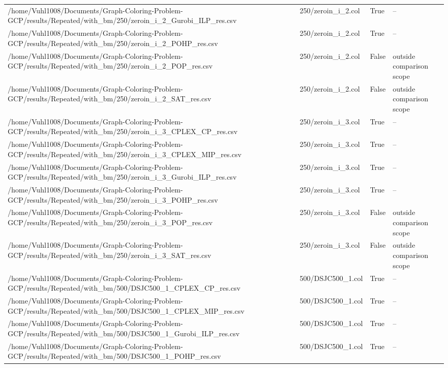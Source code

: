 \begin{table}[htbp]
\begin{tabular}{llll}
/home/Vuhl1008/Documents/Graph-Coloring-Problem-GCP/results/Repeated/with\_bm/250/zeroin\_i\_2\_Gurobi\_ILP\_res.csv & 250/zeroin\_i\_2.col & True & -- \\
/home/Vuhl1008/Documents/Graph-Coloring-Problem-GCP/results/Repeated/with\_bm/250/zeroin\_i\_2\_POHP\_res.csv & 250/zeroin\_i\_2.col & True & -- \\
/home/Vuhl1008/Documents/Graph-Coloring-Problem-GCP/results/Repeated/with\_bm/250/zeroin\_i\_2\_POP\_res.csv & 250/zeroin\_i\_2.col & False & outside comparison scope \\
/home/Vuhl1008/Documents/Graph-Coloring-Problem-GCP/results/Repeated/with\_bm/250/zeroin\_i\_2\_SAT\_res.csv & 250/zeroin\_i\_2.col & False & outside comparison scope \\
/home/Vuhl1008/Documents/Graph-Coloring-Problem-GCP/results/Repeated/with\_bm/250/zeroin\_i\_3\_CPLEX\_CP\_res.csv & 250/zeroin\_i\_3.col & True & -- \\
/home/Vuhl1008/Documents/Graph-Coloring-Problem-GCP/results/Repeated/with\_bm/250/zeroin\_i\_3\_CPLEX\_MIP\_res.csv & 250/zeroin\_i\_3.col & True & -- \\
/home/Vuhl1008/Documents/Graph-Coloring-Problem-GCP/results/Repeated/with\_bm/250/zeroin\_i\_3\_Gurobi\_ILP\_res.csv & 250/zeroin\_i\_3.col & True & -- \\
/home/Vuhl1008/Documents/Graph-Coloring-Problem-GCP/results/Repeated/with\_bm/250/zeroin\_i\_3\_POHP\_res.csv & 250/zeroin\_i\_3.col & True & -- \\
/home/Vuhl1008/Documents/Graph-Coloring-Problem-GCP/results/Repeated/with\_bm/250/zeroin\_i\_3\_POP\_res.csv & 250/zeroin\_i\_3.col & False & outside comparison scope \\
/home/Vuhl1008/Documents/Graph-Coloring-Problem-GCP/results/Repeated/with\_bm/250/zeroin\_i\_3\_SAT\_res.csv & 250/zeroin\_i\_3.col & False & outside comparison scope \\
/home/Vuhl1008/Documents/Graph-Coloring-Problem-GCP/results/Repeated/with\_bm/500/DSJC500\_1\_CPLEX\_CP\_res.csv & 500/DSJC500\_1.col & True & -- \\
/home/Vuhl1008/Documents/Graph-Coloring-Problem-GCP/results/Repeated/with\_bm/500/DSJC500\_1\_CPLEX\_MIP\_res.csv & 500/DSJC500\_1.col & True & -- \\
/home/Vuhl1008/Documents/Graph-Coloring-Problem-GCP/results/Repeated/with\_bm/500/DSJC500\_1\_Gurobi\_ILP\_res.csv & 500/DSJC500\_1.col & True & -- \\
/home/Vuhl1008/Documents/Graph-Coloring-Problem-GCP/results/Repeated/with\_bm/500/DSJC500\_1\_POHP\_res.csv & 500/DSJC500\_1.col & True & -- \\

\end{tabular}
\end{table}
